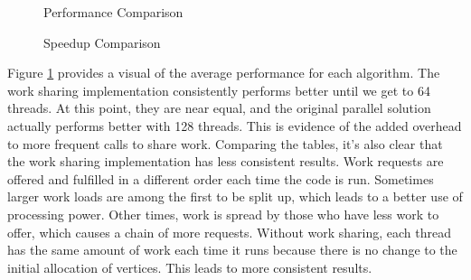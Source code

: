 \documentclass[12pt,twoside]{reedthesis}
\begin{document}
\begin{figure}[h]
	\centering
	\caption{Performance Comparison}
	\label{fig:perform}
\end{figure}

\begin{figure}[h]
	\centering
	\caption{Speedup Comparison}
	\label{fig:speed}
\end{figure}

Figure \ref{fig:perform} provides a visual of the average performance for each algorithm. The work sharing implementation consistently performs better until we get to 64 threads. At this point, they are near equal, and the original parallel solution actually performs better with 128 threads. This is evidence of the added overhead to more frequent calls to share work. Comparing the tables, it's also clear that the work sharing implementation has less consistent results. Work requests are offered and fulfilled in a different order each time the code is run. Sometimes larger work loads are among the first to be split up, which leads to a better use of processing power. Other times, work is spread by those who have less work to offer, which causes a chain of more requests. Without work sharing, each thread has the same amount of work each time it runs because there is no change to the initial allocation of vertices. This leads to more consistent results. 
\end{document}
